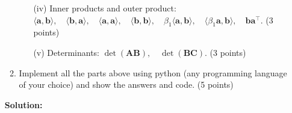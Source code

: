 \documentclass[11pt,letterpaper]{article}
\begin{document}
\begin{enumerate}
\begin{enumerate}
\begin{enumerate}
    \item [(iv)] Inner products and outer product: $\langle \mathbf{a}, \mathbf{b} \rangle, \quad \langle \mathbf{b}, \mathbf{a} \rangle, \quad \langle \mathbf{a}, \mathbf{a} \rangle, \quad \langle \mathbf{b}, \mathbf{b} \rangle, \quad \beta_1 \langle \mathbf{a}, \mathbf{b} \rangle, \quad \langle \beta_1 \mathbf{a}, \mathbf{b} \rangle, \quad \mathbf{b} \mathbf{a}^\top $. (3 points)
    
    \item [(v)] Determinants: $\det(\mathbf{AB}), \quad \det(\mathbf{BC})$. (3 points)
\end{enumerate}
\item Implement all the parts above using python (any programming language of your choice)  and show the answers and code. (5 points)
\end{enumerate}

\textbf{Solution:}


\end{enumerate}
\end{document}
